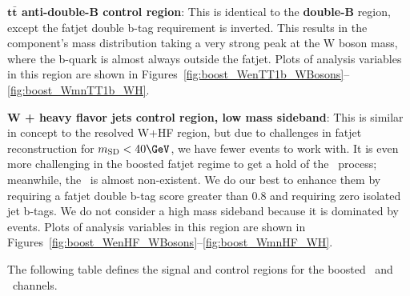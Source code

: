 \textbf{$\mathbf{t\bar{t}}$ anti-double-B control region}: This is identical to the \textbf{\ttbar double-B} region, except
the fatjet double b-tag requirement is inverted. This results in the \ttbar component's mass distribution taking a 
very strong peak at the W boson mass, where the b-quark is almost always outside the fatjet.
Plots of analysis variables in this region are shown in Figures~\ref{fig:boost_WenTT1b_WBosons}--\ref{fig:boost_WmnTT1b_WH}.

\textbf{W + heavy flavor jets control region, low mass sideband}: This is similar in concept to the resolved W+HF region, but due to 
challenges in fatjet reconstruction for $\msd < 40 \GeV$, we have fewer events to work with.
It is even more challenging in the boosted fatjet regime to get a hold of the \Wbb\ process; meanwhile, the \Wb\ is almost
non-existent. We do our best to enhance them by requiring a fatjet double b-tag score greater than 0.8
and requiring zero isolated jet b-tags. We do not consider a high mass sideband because it is dominated by \ttbar events.
Plots of analysis variables in this region are shown in Figures~\ref{fig:boost_WenHF_WBosons}--\ref{fig:boost_WmnHF_WH}.

The following table defines the signal and control regions for the boosted \WenH\ and \WmnH\ channels.


